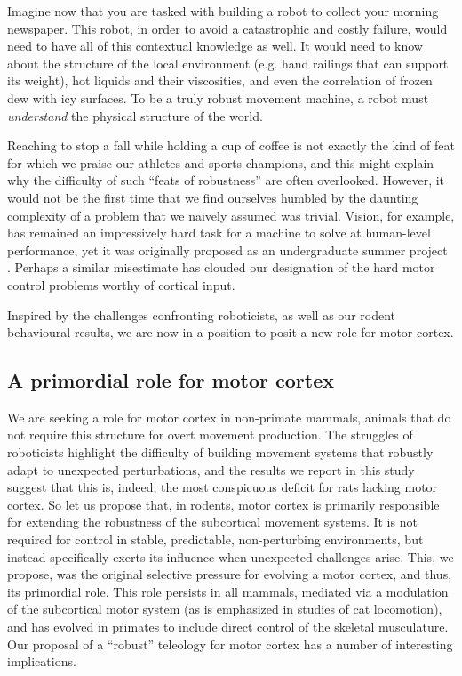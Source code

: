 Imagine now that you are tasked with building a robot to collect your morning newspaper. This robot, in order to avoid a catastrophic and costly failure, would need to have all of this contextual knowledge as well. It would need to know about the structure of the local environment (e.g. hand railings that can support its weight), hot liquids and their viscosities, and even the correlation of frozen dew with icy surfaces. To be a truly robust movement machine, a robot must \emph{understand} the physical structure of the world.

Reaching to stop a fall while holding a cup of coffee is not exactly the kind of feat for which we praise our athletes and sports champions, and this might explain why the difficulty of such ``feats of robustness'' are often overlooked. However, it would not be the first time that we find ourselves humbled by the daunting complexity of a problem that we naively assumed was trivial. Vision, for example, has remained an impressively hard task for a machine to solve at human-level performance, yet it was originally proposed as an undergraduate summer project \citep{Papert1966}. Perhaps a similar misestimate has clouded our designation of the hard motor control problems worthy of cortical input.

Inspired by the challenges confronting roboticists, as well as our rodent behavioural results, we are now in a position to posit a new role for motor cortex.

\subsection{A primordial role for motor cortex}

We are seeking a role for motor cortex in non-primate mammals, animals that do not require this structure for overt movement production. The struggles of roboticists highlight the difficulty of building movement systems that robustly adapt to unexpected perturbations, and the results we report in this study suggest that this is, indeed, the most conspicuous deficit for rats lacking motor cortex. So let us propose that, in rodents, motor cortex is primarily responsible for extending the robustness of the subcortical movement systems. It is not required for control in stable, predictable, non-perturbing environments, but instead specifically exerts its influence when unexpected challenges arise. This, we propose, was the original selective pressure for evolving a motor cortex, and thus, its primordial role. This role persists in all mammals, mediated via a modulation of the subcortical motor system (as is emphasized in studies of cat locomotion), and has evolved in primates to include direct control of the skeletal musculature. Our proposal of a ``robust'' teleology for motor cortex has a number of interesting implications.

